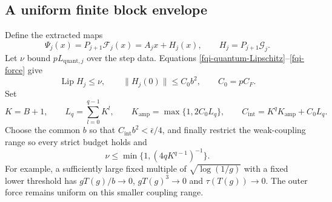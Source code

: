 \subsection{A uniform finite block envelope}
\label{fqi-envelope-section}

Define the extracted maps
\begin{equation}
 \Psi_j(x)=P_{j+1}\mathcal F_j(x)=A_jx+H_j(x),\qquad
 H_j=P_{j+1}\mathcal G_j.
 \label{fqi-extracted-map}
\end{equation}
Let $\nu$ bound $pL_{\mathrm{quant},j}$ over the step data.
Equations \eqref{fqi-quantum-Lipschitz}--\eqref{fqi-force} give
\begin{equation}
 \operatorname{Lip}H_j\le\nu,\qquad
 \|H_j(0)\|\le C_0b^2,\qquad C_0=pC_F.
 \label{fqi-perturbation-bounds}
\end{equation}
Set
\begin{equation}
 K=B+1,\qquad L_q=\sum_{l=0}^{q-1}K^l,\qquad
 K_{\mathrm{amp}}=\max\{1,2C_0L_q\},\qquad
 C_{\mathrm{int}}=K^qK_{\mathrm{amp}}+C_0L_q.
 \label{fqi-envelope-constants}
\end{equation}
Choose the common $b$ so that $C_{\mathrm{int}}b^2<\bar\epsilon/4$,
and finally restrict the weak-coupling range so every strict
budget holds and
\begin{equation}
 \nu\le\min\{1,(4qK^{q-1})^{-1}\}.
 \label{fqi-nu-choice}
\end{equation}
For example, a sufficiently large fixed multiple of
$\sqrt{\log(1/g)}$ with a fixed lower threshold has
$gT(g)/b\to0$, $gT(g)^3\to0$ and $\tau(T(g))\to0$.
The outer force remains uniform on this smaller coupling range.

